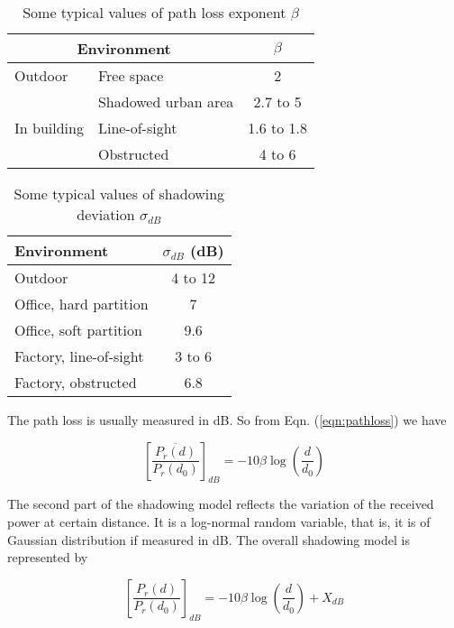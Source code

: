 \begin{table}
\begin{center}
  \centering \small
  \begin{tabular}{|l|l|c|}
  \hline \multicolumn{2}{|c|}{\bf{Environment}} & $\beta$ \\
  \hline Outdoor & Free space & 2 \\
  \cline{2 - 3}  & Shadowed urban area & 2.7 to 5 \\
  \hline In building & Line-of-sight & 1.6 to 1.8 \\
  \cline{2 - 3}  & Obstructed & 4 to 6 \\ \hline
  \end{tabular}
  \caption{Some typical values of path loss exponent $\beta$}
  \label{tab:pathlossexp}
\end{center}
\end{table}
\begin{table}
\begin{center}
  \centering \small
  \begin{tabular}{|l|c|}
  \hline \bf{Environment} & $\sigma_{dB}$ (dB) \\
  \hline Outdoor & 4 to 12 \\
  \hline Office, hard partition & 7 \\
  \hline Office, soft partition & 9.6 \\
  \hline Factory, line-of-sight & 3 to 6 \\
  \hline Factory, obstructed & 6.8 \\ \hline
  \end{tabular}
  \caption{Some typical values of shadowing deviation $\sigma_{dB}$}
  \label{tab:stddb}
\end{center}
\end{table}

The path loss is usually measured in dB. So from Eqn. (\ref{eqn:pathloss})
we have

\begin{equation}
  {\left[ \frac{\overline{P_r(d)}}{P_r(d_0)} \right]}_{dB} =
    -10 \beta \log \left( \frac{d}{d_0} \right)
  \label{eqn:pathlossdb}
\end{equation}

The second part of the shadowing model reflects the variation of the
received power at certain distance. It is a log-normal random variable,
that is, it is of Gaussian distribution if measured in dB. The overall
shadowing model is represented by

\begin{equation}
{\left[ \frac{P_r(d)}{P_r(d_0)} \right]}_{dB} =
    -10 \beta \log \left( \frac{d}{d_0} \right) + X_{dB}
  \label{eqn:shadowing}
\end{equation}

